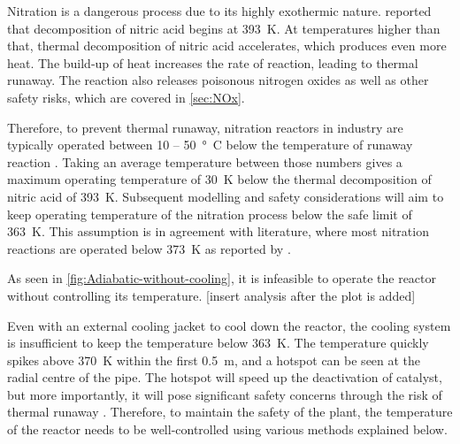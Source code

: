 Nitration is a dangerous process due to its highly exothermic nature. \textcite{di_miceli_raimondi_safety_2015} reported that decomposition of nitric acid begins at \SI{393}{\K}. At temperatures higher than that, thermal decomposition of nitric acid accelerates, which produces even more heat. The build-up of heat increases the rate of reaction, leading to thermal runaway. The reaction also releases poisonous nitrogen oxides as well as other safety risks, which are covered in \cref{sec:NOx}. 

Therefore, to prevent thermal runaway, nitration reactors in industry are typically operated between \si{10} – \SI{50}{°C} below the temperature of runaway reaction \cite{noauthor_lees_2012}. Taking an average temperature between those numbers gives a maximum operating temperature of \SI{30}{\K} below the thermal decomposition of nitric acid of \SI{393}{\K}. Subsequent modelling and safety considerations will aim to keep operating temperature of the nitration process below the safe limit of \SI{363}{\K}. This assumption is in agreement with literature, where most nitration reactions are operated below \SI{373}{\K} as reported by \textcite{chen_experimental_1998}.

As seen in \cref{fig:Adiabatic-without-cooling}, it is infeasible to operate the reactor without controlling its temperature. [insert analysis after the plot is added]

Even with an external cooling jacket to cool down the reactor, the cooling system is insufficient to keep the temperature below \SI{363}{\K}. The temperature quickly spikes above \SI{370}{\K} within the first \SI{0.5}{\m}, and a hotspot can be seen at the radial centre of the pipe. The hotspot will speed up the deactivation of catalyst, but more importantly, it will pose significant safety concerns through the risk of thermal runaway \cite{nguyen_flow_1994}. Therefore, to maintain the safety of the plant, the temperature of the reactor needs to be well-controlled using various methods explained below.

